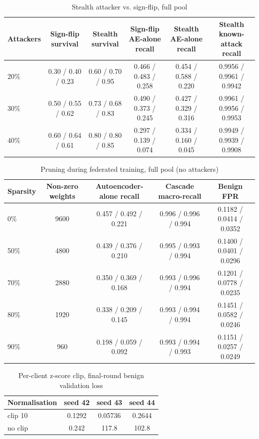 \begin{table}[H]
\centering
\scriptsize
\setlength{\tabcolsep}{3pt}
\renewcommand{\arraystretch}{1.15}
\begin{tabular}{|l|c|c|c|c|c|}
\hline
\textbf{Attackers} & \textbf{Sign-flip survival} & \textbf{Stealth survival} & \textbf{Sign-flip AE-alone recall} & \textbf{Stealth AE-alone recall} & \textbf{Stealth known-attack recall} \\ \hline
20\% & 0.30 / 0.40 / 0.23 & 0.60 / 0.70 / 0.95 & 0.466 / 0.483 / 0.258 & 0.454 / 0.588 / 0.220 & 0.9956 / 0.9961 / 0.9942 \\ \hline
30\% & 0.50 / 0.55 / 0.62 & 0.73 / 0.68 / 0.83 & 0.490 / 0.373 / 0.245 & 0.427 / 0.329 / 0.316 & 0.9961 / 0.9956 / 0.9953 \\ \hline
40\% & 0.60 / 0.64 / 0.61 & 0.80 / 0.80 / 0.85 & 0.297 / 0.139 / 0.074 & 0.334 / 0.160 / 0.045 & 0.9949 / 0.9939 / 0.9908 \\ \hline
\end{tabular}
\caption{Stealth attacker vs. sign-flip, full pool}
\label{tab:full_stealth}
\end{table}

\begin{table}[H]
\centering
\scriptsize
\setlength{\tabcolsep}{3pt}
\renewcommand{\arraystretch}{1.15}
\begin{tabular}{|l|c|c|c|c|}
\hline
\textbf{Sparsity} & \textbf{Non-zero weights} & \textbf{Autoencoder-alone recall} & \textbf{Cascade macro-recall} & \textbf{Benign FPR} \\ \hline
0\% & 9600 & 0.457 / 0.492 / 0.221 & 0.996 / 0.996 / 0.994 & 0.1182 / 0.0414 / 0.0352 \\ \hline
50\% & 4800 & 0.439 / 0.376 / 0.210 & 0.995 / 0.993 / 0.994 & 0.1400 / 0.0401 / 0.0296 \\ \hline
70\% & 2880 & 0.350 / 0.369 / 0.168 & 0.993 / 0.996 / 0.994 & 0.1201 / 0.0778 / 0.0235 \\ \hline
80\% & 1920 & 0.338 / 0.209 / 0.145 & 0.993 / 0.994 / 0.994 & 0.1451 / 0.0582 / 0.0246 \\ \hline
90\% & 960 & 0.198 / 0.059 / 0.092 & 0.993 / 0.994 / 0.993 & 0.1151 / 0.0257 / 0.0249 \\ \hline
\end{tabular}
\caption{Pruning during federated training, full pool (no attackers)}
\label{tab:full_pruning}
\end{table}

\begin{table}[H]
\centering
\small
\setlength{\tabcolsep}{3pt}
\renewcommand{\arraystretch}{1.15}
\begin{tabular}{|l|c|c|c|}
\hline
\textbf{Normalisation} & \textbf{seed 42} & \textbf{seed 43} & \textbf{seed 44} \\ \hline
clip 10 & 0.1292 & 0.05736 & 0.2644 \\ \hline
no clip & 0.242 & 117.8 & 102.8 \\ \hline
\end{tabular}
\caption{Per-client z-score clip, final-round benign validation loss}
\label{tab:full_clip}
\end{table}

